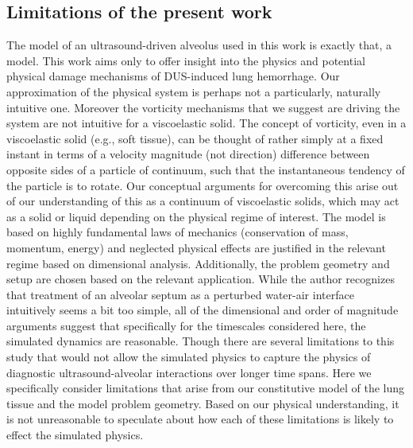 \subsection{Limitations of the present work}
The model of an ultrasound-driven alveolus used in this work is
exactly that, a model. This work aims only to offer insight into the
physics and potential physical damage mechanisms of \ac{DUS}-induced
lung hemorrhage. Our approximation of the physical system is perhaps
not a particularly, naturally intuitive one. Moreover the vorticity
mechanisms that we suggest are driving the system are not intuitive
for a viscoelastic solid. The concept of vorticity, even in a
viscoelastic solid (e.g., soft tissue), can be thought of rather
simply at a fixed instant in terms of a velocity magnitude (not
direction) difference between opposite sides of a particle of
continuum, such that the instantaneous tendency of the particle is to
rotate. Our conceptual arguments for overcoming this arise out of our
understanding of this as a continuum of viscoelastic solids, which may
act as a solid or liquid depending on the physical regime of
interest. The model is based on highly fundamental laws of mechanics
(conservation of mass, momentum, energy) and neglected physical
effects are justified in the relevant regime based on dimensional
analysis. Additionally, the problem geometry and setup are chosen
based on the relevant application. While the author recognizes that
treatment of an alveolar septum as a perturbed water-air interface
intuitively seems a bit too simple, all of the dimensional and order
of magnitude arguments suggest that specifically for the timescales
considered here, the simulated dynamics are reasonable. Though there
are several limitations to this study that would not allow the
simulated physics to capture the physics of diagnostic
ultrasound-alveolar interactions over longer time spans. Here we
specifically consider limitations that arise from our constitutive
model of the lung tissue and the model problem geometry. Based on our
physical understanding, it is not unreasonable to speculate about how
each of these limitations is likely to effect the simulated physics.

